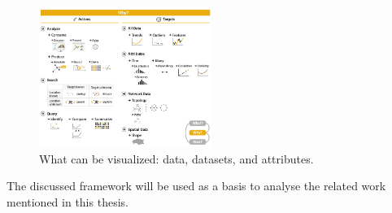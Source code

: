 \begin{figure}[!htb]
\centering
\includegraphics[width=0.5\textwidth,keepaspectratio]{images/basics/why.png}
\caption[
    What can be visualized: data, datasets, and attributes .
]{What can be visualized: data, datasets, and attributes.}
\label{fig:why}
\end{figure}

The discussed framework will be used as a basis to analyse the related work mentioned in this thesis.

